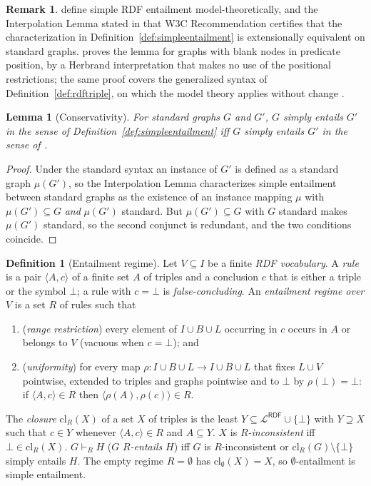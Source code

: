 \documentclass[12pt]{article}
\newtheorem{lemma}{Lemma}
\theoremstyle{definition}
\newtheorem{definition}{Definition}
\newtheorem{remark}{Remark}
\newcommand{\tuple}[1]{\langle #1 \rangle}
\newcommand{\Lrdf}{\mathcal{L}^{\mathsf{RDF}}}  %
\newcommand{\cl}{\mathrm{cl}}   %
\begin{document}
\begin{remark}
\label{rem:interpolation}
\citet[\S 5.3, App.~C]{hayes2014rdf} define simple RDF entailment model-theoretically, and the Interpolation Lemma stated in that W3C Recommendation certifies that the characterization in Definition~\ref{def:simpleentailment} is extensionally equivalent on standard graphs. \citet[Lemma~2.8]{terhorst2005completeness} proves the lemma for graphs with blank nodes in predicate position, by a Herbrand interpretation that makes no use of the positional restrictions; the same proof covers the generalized syntax of Definition~\ref{def:rdftriple}, on which the model theory applies without change \citep{hayes2014rdf}.
\end{remark}

\begin{lemma}[Conservativity]
\label{lem:conservative}
For standard graphs $G$ and $G'$, $G$ simply entails $G'$ in the sense of Definition~\ref{def:simpleentailment} iff $G$ simply entails $G'$ in the sense of \citet{hayes2014rdf}.
\end{lemma}

\begin{proof}
Under the standard syntax an instance of $G'$ is defined as a standard graph $\mu(G')$, so the Interpolation Lemma characterizes simple entailment between standard graphs as the existence of an instance mapping $\mu$ with $\mu(G') \subseteq G$ \emph{and} $\mu(G')$ standard. But $\mu(G') \subseteq G$ with $G$ standard makes $\mu(G')$ standard, so the second conjunct is redundant, and the two conditions coincide.
\end{proof}

\begin{definition}[Entailment regime]
\label{def:entailmentregime}
Let $V \subseteq I$ be a finite \textit{RDF vocabulary}. A \textit{rule} is a pair $\tuple{A,c}$ of a finite set $A$ of triples and a conclusion $c$ that is either a triple or the symbol $\bot$; a rule with $c = \bot$ is \textit{false-concluding}. An \textit{entailment regime over $V$} is a set $R$ of rules such that
\begin{enumerate}
\item (\textit{range restriction}) every element of $I \cup B \cup L$ occurring in $c$ occurs in $A$ or belongs to $V$ (vacuous when $c = \bot$); and
\item (\textit{uniformity}) for every map $\rho: I \cup B \cup L \rightarrow I \cup B \cup L$ that fixes $L \cup V$ pointwise, extended to triples and graphs pointwise and to $\bot$ by $\rho(\bot) = \bot$: if $\tuple{A,c} \in R$ then $\tuple{\rho(A), \rho(c)} \in R$.
\end{enumerate}
The \textit{closure} $\cl_R(X)$ of a set $X$ of triples is the least $Y \subseteq \Lrdf \cup \{\bot\}$ with $Y \supseteq X$ such that $c \in Y$ whenever $\tuple{A,c} \in R$ and $A \subseteq Y$. $X$ is \textit{$R$-inconsistent} iff $\bot \in \cl_R(X)$. $G \vdash_R H$ ($G$ \textit{$R$-entails} $H$) iff $G$ is $R$-inconsistent or $\cl_R(G) \setminus \{\bot\}$ simply entails $H$. The empty regime $R = \emptyset$ has $\cl_{\emptyset}(X) = X$, so $\emptyset$-entailment is simple entailment.
\end{definition}
\end{document}
